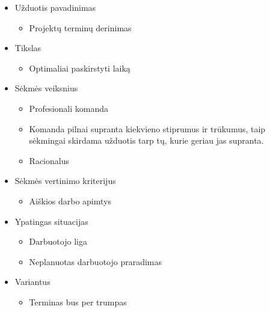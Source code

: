 \documentclass[10pt]{IEEEtran}
\begin{document}
            \enspace\enspace\enspace

            \begin{itemize}
                \item Užduotis pavadinimas
                \begin{itemize}
                    \item Projektų terminų derinimas
                \end{itemize}
                \item Tikslas
                \begin{itemize}
                    \item Optimaliai paskirstyti laiką
                \end{itemize}
                \item Sėkmės veiksnius
                \begin{itemize}
                    \item Profesionali komanda
                    \item Komanda pilnai supranta kiekvieno stiprumus ir trūkumus, taip sėkmingai skirdama užduotis tarp tų, kurie geriau jas supranta.
                    \item Racionalus 
                \end{itemize}
                \item Sėkmės vertinimo kriterijus
                \begin{itemize}
                    \item Aiškios darbo apimtys
                \end{itemize}
                \item Ypatingas situacijas
                \begin{itemize}
                    \item Darbuotojo liga
                    \item Neplanuotas darbuotojo praradimas
                \end{itemize}
                \item Variantus
                \begin{itemize}
                    \item Terminas bus per trumpas
                \end{itemize}
            \end{itemize}

            \enspace\enspace\enspace
\end{document}
